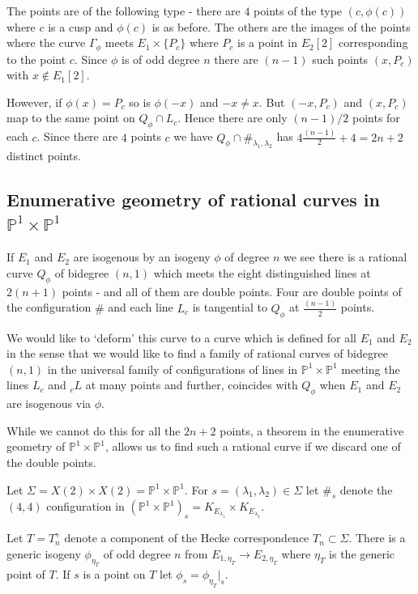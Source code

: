 \documentclass[11pt,a4paper]{article}
\newcommand {\CP}{{\mathds P}}
\newcommand {\lb}{{\lambda}}
\newcommand {\CPP}{\CP^1 \times \CP^1}
\begin{document}
The points are of the following type - there are $4$ points of the type $(c,\phi(c))$ where $c$ is a cusp and $\phi(c)$ is as before. The others are the images of the points where the curve $\Gamma_{\phi}$ meets $E_1 \times \{P_c\}$ where $P_c$ is a point in $E_2[2]$ corresponding to the point $c$. Since $\phi$ is of odd degree $n$ there are $(n-1)$ such points $(x,P_c)$ with $x \notin E_1[2]$.
 
However, if $\phi(x)=P_c$ so is $\phi(-x)$ and $-x \neq x$. But $(-x,P_c)$ and $(x,P_c)$ map to the same point on $Q_{\phi} \cap  L_c$. Hence there are only $(n-1)/2$ points for each $c$. Since there are $4$ points $c$ we have $Q_{\phi} \cap \#_{\lb_1,\lb_2}$ has  $4\frac{(n-1)}{2}+4=2n+2$ distinct points. 

\subsection{Enumerative geometry of rational curves in  $\CPP$}
\label{ssec-enumerative-geom-ratl-curves-p1-p1} 

If $E_1$ and $E_2$ are isogenous by an isogeny $\phi$ of degree $n$ we see  there is a rational curve $Q_{\phi}$ of bidegree $(n,1)$ which meets the eight distinguished lines at $2(n+1)$  points - and  all of them are double points. Four are double points of the configuration $\#$ and each line $L_c$ is tangential to $Q_{\phi}$ at $\frac{(n-1)}{2}$ points. 

We would like to `deform' this curve to a curve which is defined for all $E_1$ and $E_2$ in the sense that we would like to find a family of rational curves of bidegree $(n,1)$ in the universal family of configurations of lines in $\CPP$ meeting the  lines $L_c$ and ${}_cL$ at many points and further, coincides with $Q_{\phi}$ when $E_1$ and $E_2$ are isogenous via $\phi$. 

While we cannot do this for all the $2n+2$ points, a theorem in the enumerative geometry of $\CPP$, allows us to find such a rational curve if we discard one of the double points. 

Let $\Sigma=X(2)\times X(2)=\CPP$. For $s=(\lb_1,\lb_2) \in \Sigma$ let $\#_s$ denote the $(4,4)$ configuration in $(\CPP)_s=K_{E_{\lb_1}} \times K_{E_{\lb_2}}$. 

Let $T=T^{\gamma}_n$ denote a component of the Hecke correspondence $T_n \subset \Sigma$.  There is a generic  isogeny $\phi_{\eta_T}$ of odd degree $n$ from $E_{1,\eta_T} \rightarrow E_{2,\eta_T}$ where $\eta_T$ is the generic point of  $T$. If $s$ is a point on $T$ let $\phi_s=\phi_{\eta_T}|_s$. 
\end{document}
